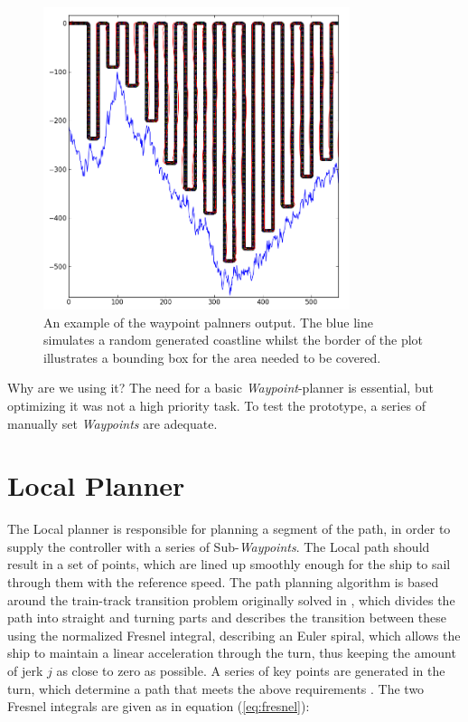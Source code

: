 \begin{figure}
\centering
\includegraphics[width = 0.8\textwidth]{img/LocalPlannerFigures/Auto_WP_Planning.png}
\caption{An example of the waypoint palnners output. The blue line simulates a random generated coastline whilst the border of the plot illustrates a bounding box for the area needed to be covered.}
\label{fig:wp_planner}
\end{figure}

Why are we using it?
The need for a basic \emph{Waypoint}-planner is essential, but optimizing it was not a high priority task. To test the prototype, a series of manually set \emph{Waypoints} are adequate.

\section{Local Planner}

The Local planner is responsible for planning a segment of the path, in order to supply the controller with a series of Sub-\emph{Waypoints}. The Local path should result in a set of points, which are lined up smoothly enough for the ship to sail through them with the reference speed.
The path planning algorithm is based around the train-track transition problem originally solved in \cite{Art1}, which divides the path into straight and turning parts and describes the transition between these using the normalized Fresnel integral, describing an Euler spiral, which allows the ship to maintain a linear acceleration through the turn, thus keeping the amount of jerk $j$ as close to zero as possible. A series of key points are generated in the turn, which determine a path that meets the above requirements \cite{Art2}. The two Fresnel integrals are given as in equation (\ref{eq:fresnel}):

